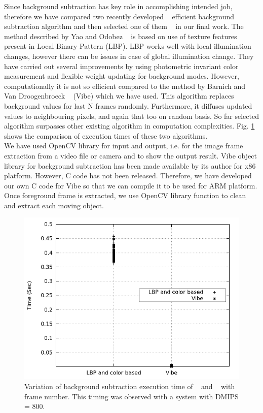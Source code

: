 \documentclass[conference]{IEEEtran}
\begin{document}
\indent Since background subtraction has key role in accomplishing
intended job, therefore we have compared two recently developed
~\cite{3, 5} efficient background subtraction algorithm and then
selected one of them ~\cite{5} in our final work.  The method described
by Yao and Odobez ~\cite{3} is based on use of texture features present
in Local Binary Pattern (LBP).  LBP works well with local illumination
changes, however there can be issues in case of global illumination
change. They have carried out several improvements by using photometric
invariant color measurement and flexible weight updating for background
modes. However, computationally it is not so efficient compared to the
method by Barnich and Van Droogenbroeck ~\cite{5} (Vibe) which we have
used. This algorithm replaces background values for last N frames
randomly.  Furthermore, it diffuses updated values to neighbouring
pixels, and again that too on random basis. So far selected algorithm
surpasses other existing algorithm in computation complexities. Fig.
\ref{bg_compare} shows the comparison of execution times of these two
algorithms.\\
\indent We have used OpenCV library for input and output, i.e.  for
the image frame extraction from a video file or camera and to show the
output result. Vibe object library for background subtraction has been
made available by its author for x86 platform. However, C code has not
been released. Therefore, we have developed our own C code for Vibe so
that we can compile it to be used for ARM platform. Once foreground
frame is extracted, we use OpenCV library function to clean and extract
each moving object.\\

\begin{figure}[!h]
\centering
\includegraphics[scale=0.35]{figures/bg_compare}
\caption{Variation of background subtraction execution time of ~\cite{3}
and ~\cite{5} with frame number. This timing was observed with a system
with DMIPS = 800.}
\label{bg_compare}
\end{figure}
\end{document}
